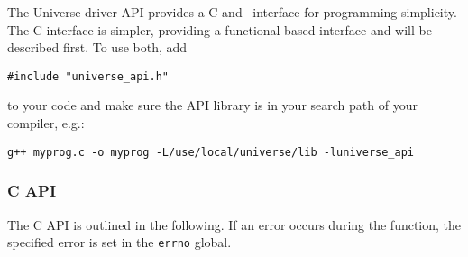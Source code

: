 The Universe driver API provides a C and \cpp~interface for programming simplicity.
The C interface is simpler, providing a functional-based interface and will be described first.
To use both, add 
		\begin{lstlisting}
#include "universe_api.h"
		\end{lstlisting}
to your code and make sure the API library is in your search path of your compiler, e.g.:
		\begin{lstlisting}
g++ myprog.c -o myprog -L/use/local/universe/lib -luniverse_api
		\end{lstlisting}

			\subsubsection{C API}
The C API is outlined in the following.  If an error occurs during the function, the specified error is set in 
the \lstinline!errno! global.
